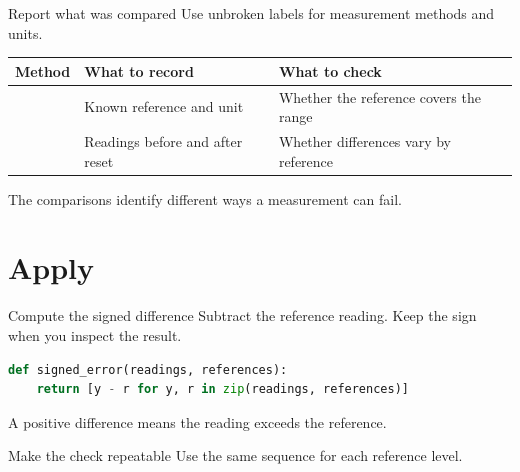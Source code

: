 \begin{frame}{Report what was compared}
Use unbroken labels for measurement methods and units.
\CoreParagraphToTable
\begingroup\CoreTableLayout
\begin{tabularx}{\linewidth}{@{}p{.30\linewidth}YY@{}}
\toprule
\textbf{Method} & \textbf{What to record} & \textbf{What to check}\\
\midrule
{} & Known reference and unit & Whether the reference covers the range\\
 & Readings before and after reset & Whether differences vary by reference\\
\bottomrule
\end{tabularx}
\endgroup
\CoreTableToInterpretation
The comparisons identify different ways a measurement can fail.
\end{frame}

\section{Apply}
\begin{frame}[fragile]{Compute the signed difference}
Subtract the reference reading. Keep the sign when you inspect the result.
\CoreWithinGroup
\begin{lstlisting}[language=Python]
def signed_error(readings, references):
    return [y - r for y, r in zip(readings, references)]
\end{lstlisting}
\CoreBetweenGroups
A positive difference means the reading exceeds the reference.
\end{frame}

\begin{frame}{Make the check repeatable}
Use the same sequence for each reference level.
\CoreParagraphToFigure
{}
\CoreBetweenGroups
{}
\end{frame}


